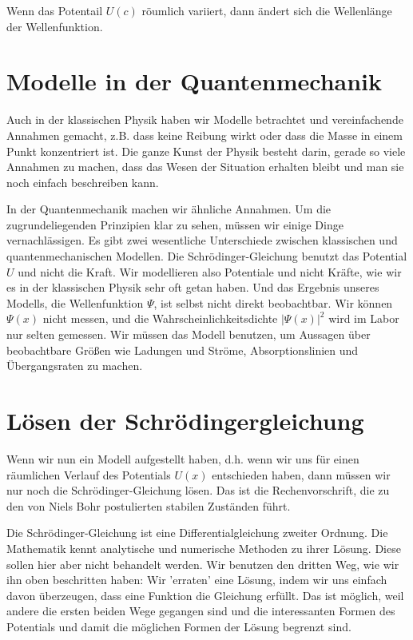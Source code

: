 \begin{marginfigure}
    \caption{Wenn das Potentail $U(c)$ röumlich variiert, dann ändert sich die Wellenlänge der Wellenfunktion.}
    \label{fig:3_potential_slope_WF}
\end{marginfigure}




\section{Modelle in der Quantenmechanik}

Auch in der klassischen Physik haben wir Modelle betrachtet und vereinfachende Annahmen gemacht, z.B. dass keine Reibung wirkt oder dass die Masse in einem Punkt konzentriert ist. Die ganze Kunst der Physik besteht darin, gerade so viele Annahmen zu machen, dass das Wesen der Situation erhalten bleibt und man sie noch einfach beschreiben kann.

In der Quantenmechanik machen wir ähnliche Annahmen. Um die zugrundeliegenden Prinzipien klar zu sehen, müssen wir einige Dinge vernachlässigen. Es gibt zwei wesentliche Unterschiede zwischen klassischen und quantenmechanischen Modellen. Die Schrödinger-Gleichung benutzt das Potential $U$ und nicht die Kraft. Wir modellieren also Potentiale und nicht Kräfte, wie wir es in der klassischen Physik sehr oft getan haben. Und das Ergebnis unseres Modells, die Wellenfunktion $\Psi$, ist selbst nicht direkt beobachtbar. Wir können $\Psi(x)$ nicht messen, und die Wahrscheinlichkeitsdichte $|\Psi(x)|^2$ wird im Labor nur selten gemessen. Wir müssen das Modell benutzen, um Aussagen über beobachtbare Größen wie Ladungen und Ströme, Absorptionslinien und Übergangsraten zu machen.


\section{Lösen der Schrödingergleichung}

Wenn wir nun ein Modell aufgestellt haben, d.h. wenn wir uns für einen räumlichen Verlauf des Potentials $U(x)$ entschieden haben, dann müssen wir nur noch die Schrödinger-Gleichung lösen. Das ist die Rechenvorschrift, die zu den von Niels Bohr postulierten stabilen Zuständen führt.

Die Schrödinger-Gleichung ist eine Differentialgleichung zweiter Ordnung. Die Mathematik kennt analytische und numerische Methoden zu ihrer Lösung. Diese sollen hier aber nicht behandelt werden. Wir benutzen den dritten Weg, wie wir ihn oben beschritten haben: Wir 'erraten' eine Lösung, indem wir uns einfach davon überzeugen, dass eine Funktion die Gleichung erfüllt. Das ist möglich, weil andere die ersten beiden Wege gegangen sind und die interessanten Formen des Potentials und damit die möglichen Formen der Lösung begrenzt sind.

